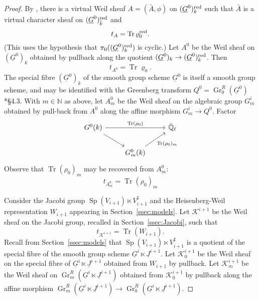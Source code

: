 \documentclass[10pt]{amsart}
\theoremstyle{plain}
\theoremstyle{definition}
\newcommand{\NN}{{\mathbb{N}}}
\newcommand{\EE}{\mathbb{\bar Q}_\ell}
\newcommand{\bFq}{\bar{k}}
\newcommand{\Fq}{k}
\DeclareMathOperator{\Gr}{Gr}
\DeclareMathOperator{\trace}{Tr}
\newcommand{\trFrob}[1]{t_{#1}}
\newcommand{\cs}[1]{{\mathcal{#1}}}
\newcommand{\Sp}{{\operatorname{Sp}}}
\begin{document}
\begin{proof}
By \cite{lusztig:disconnected1}, there is a virtual Weil sheaf $A = ({\bar A},\phi)$ on $(\underline{G}^0)_\Fq^\reductive$ such that ${\bar A}$ is a virtual character sheaf on $(\underline{G}^0)_{\bFq}^\reductive$ and
\[
\trFrob{A} = \trace \varrho_0^\reductive.
\]
(This uses the hypothesis that $\pi_0((\underline{G}^0)_\Fq^\reductive)$ is cyclic.)
Let $A^0$ be the Weil sheaf on $(\underline{G}^0)_\Fq$ obtained by pullback along the quotient $(\underline{G}^0)_\Fq \to (\underline{G}^0)_\Fq^\reductive$.
Then 
\[
\trFrob{A^0} = \trace \varrho_0.
\]
The special fibre $(\underline{G}^0)_\Fq$ of the smooth group scheme $\underline{G}^0$ is itself a smooth group scheme, and may be identified with the Greenberg transform $Q^0 = \Gr^{R}_0(\underline{G}^0)$ \cite{cunningham-roe:13a}*{\S 4.3}. 
With $m\in \NN$ as above, let ${A}_m^0$ be the Weil sheaf on the algebraic group $G_m^i$ obtained by pull-back from $A^0$ along the affine morphism $G_m^i \to Q^0$.
Factor
\[
\begin{tikzcd}
G^0(\Fq) \arrow{rr}{\trace(\rho_0)} \arrow{rd} && \EE \\
& G_m^0(\Fq) \arrow{ru}[swap]{\trace(\rho_0)_m} 
\end{tikzcd}
\]
Observe that $\trace(\rho_0)_m$ may be recovered from ${A}_m^0$:
\[
\trFrob{{A}^0_m} = \trace(\rho_0)_m
\]

Consider the Jacobi group $\Sp(V_{i+1})\ltimes V_{i+1}^\sharp$ and the Heisenberg-Weil representation $W_{i+1}$ appearing in Section~\ref{ssec:models}.
Let $\cs{K}^{i+1}$ be the Weil sheaf on the Jacobi group, recalled in Section~\ref{ssec:Jacobi}, such that
\[
\trFrob{\cs{K}^{i+1}} = \trace(W_{i+1}).
\]
Recall from Section~\ref{ssec:models} that $\Sp(V_{i+1})\ltimes V_{i+1}^\sharp$ is a quotient of the special fibre of the smooth group scheme $\underline{G}^{i} \ltimes \underline{J}^{i+1}$.
Let $\cs{K}_0^{i+1}$ be the Weil sheaf on the special fibre of $\underline{G}^{i} \ltimes \underline{J}^{i+1}$ obtained from $W_{i+1}$ by pullback. 
Let $\cs{K}_m^{i+1}$ be the Weil sheaf on $\Gr^{R}_m(\underline{G}^{i} \ltimes \underline{J}^{i+1})$ obtained from $\cs{K}_0^{i+1}$ by pullback along the affine morphism
$\Gr^{R}_m(\underline{G}^{i} \ltimes \underline{J}^{i+1}) \to \Gr^{R}_0(\underline{G}^{i} \ltimes \underline{J}^{i+1})$.


\end{proof}
\end{document}
